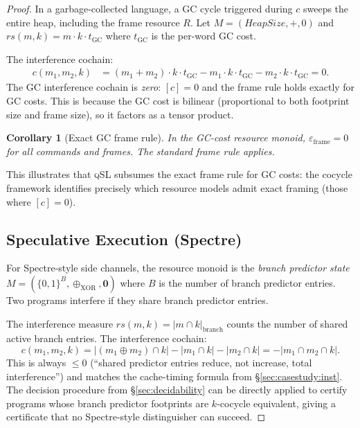 \documentclass[acmsmall,sigplan,anonymous,review,screen]{acmart}
\theoremstyle{plain}
\newtheorem{corollary}[theorem]{Corollary}
\theoremstyle{definition}
\newcommand{\qSL}{\textsc{qSL}\xspace}
\newcommand{\rs}{\mathit{rs}}
\newcommand{\defect}{\varepsilon}
\begin{document}
\begin{proof}
In a garbage-collected language, a GC cycle triggered during $c$ sweeps
the entire heap, including the frame resource $R$.  Let
$M = (\mathit{HeapSize}, +, 0)$ and $\rs(m, k) = m \cdot k \cdot t_{\mathrm{GC}}$
where $t_{\mathrm{GC}}$ is the per-word GC cost.

The interference cochain:
\begin{align*}
  c(m_1, m_2, k) &= (m_1 + m_2) \cdot k \cdot t_{\mathrm{GC}}
    - m_1 \cdot k \cdot t_{\mathrm{GC}} - m_2 \cdot k \cdot t_{\mathrm{GC}} = 0.
\end{align*}
The GC interference cochain is \emph{zero}: $[c] = 0$ and the frame
rule holds exactly for GC costs.  This is because the GC cost is
bilinear (proportional to both footprint size and frame size), so it
factors as a tensor product.

\begin{corollary}[Exact GC frame rule]
  In the GC-cost resource monoid, $\defect_{\mathrm{frame}} = 0$ for all
  commands and frames.  The standard frame rule applies.
\end{corollary}

This illustrates that \qSL subsumes the exact frame rule for GC costs:
the cocycle framework identifies precisely which resource models admit
exact framing (those where $[c] = 0$).

\subsection{Speculative Execution (Spectre)}
\label{sec:applications:spectre}

For Spectre-style side channels, the resource monoid is the
\emph{branch predictor state} $M = (\{0,1\}^B, \oplus_{\mathrm{XOR}}, \mathbf{0})$
where $B$ is the number of branch predictor entries.  Two programs
interfere if they share branch predictor entries.

The interference measure $\rs(m, k) = |m \cap k|_{\mathrm{branch}}$
counts the number of shared active branch entries.  The interference cochain:
\[
  c(m_1, m_2, k) = |(m_1 \oplus m_2) \cap k| - |m_1 \cap k| - |m_2 \cap k|
  = -|m_1 \cap m_2 \cap k|.
\]
This is always $\leq 0$ (``shared predictor entries reduce, not increase,
total interference'') and matches the cache-timing formula from
\S\ref{sec:casestudy:inst}.  The decision procedure from
\S\ref{sec:decidability} can be directly applied to certify programs whose
branch predictor footprints are $k$-cocycle equivalent, giving a
certificate that no Spectre-style distinguisher can succeed.


\end{proof}
\end{document}
